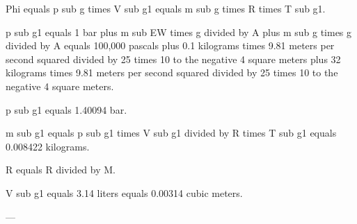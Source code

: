 Phi equals p sub g times V sub g1 equals m sub g times R times T sub g1.  

p sub g1 equals 1 bar plus m sub EW times g divided by A plus m sub g times g divided by A equals 100,000 pascals plus 0.1 kilograms times 9.81 meters per second squared divided by 25 times 10 to the negative 4 square meters plus 32 kilograms times 9.81 meters per second squared divided by 25 times 10 to the negative 4 square meters.  

p sub g1 equals 1.40094 bar.  

m sub g1 equals p sub g1 times V sub g1 divided by R times T sub g1 equals 0.008422 kilograms.  

R equals R divided by M.  

V sub g1 equals 3.14 liters equals 0.00314 cubic meters.  

---